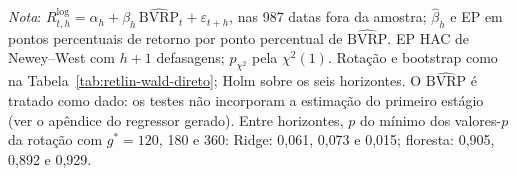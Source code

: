 \begin{table}[H]
\begin{tabular}{rrrrrrrrr}
\bottomrule
\end{tabular}
\par\smallskip
\parbox{0.95\linewidth}{\footnotesize\textit{Nota}: $R^{\log}_{t,h} = \alpha_h + \beta_h\,\widehat{\text{BVRP}}_t + \varepsilon_{t+h}$, nas 987 datas fora da amostra; $\hat\beta_h$ e EP em pontos percentuais de retorno por ponto percentual de $\widehat{\text{BVRP}}$. EP HAC de Newey--West com $h+1$ defasagens; $p_{\chi^2}$ pela $\chi^2(1)$. Rotação e bootstrap como na Tabela~\ref{tab:retlin-wald-direto}; Holm sobre os seis horizontes. O $\widehat{\text{BVRP}}$ é tratado como dado: os testes não incorporam a estimação do primeiro estágio (ver o apêndice do regressor gerado). Entre horizontes, $p$ do mínimo dos valores-$p$ da rotação com $g^* = 120$, 180 e 360: Ridge: 0{,}061, 0{,}073 e 0{,}015; floresta: 0{,}905, 0{,}892 e 0{,}929.}
\end{table}
